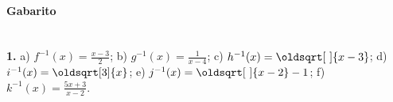 \documentclass[a4paper,12pt]{article}
\renewcommand*{\sqrt}[2][\ ]{\oldsqrt[#1]{#2}}
\begin{document}
\vspace*{\fill}
{\footnotesize
\paragraph*{Gabarito} \hspace*{\fill}\\
\textbf{1.} a) $f^{-1}(x) = \frac{x-3}{2}$; b) $g^{-1}(x) = \frac{1}{x-4}$; c) $h^{-1}(x) = \sqrt{x-3}$; d) $i^{-1}(x) = \sqrt[3]{x}$; e) $j^{-1}(x) = \sqrt{x-2} - 1 $; f) $k^{-1}(x) = \frac{5x + 3}{x - 2}$.
}
\end{document}
